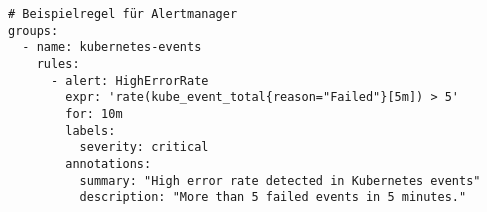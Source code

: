 \begin{verbatim}
# Beispielregel für Alertmanager
groups:
  - name: kubernetes-events
    rules:
      - alert: HighErrorRate
        expr: 'rate(kube_event_total{reason="Failed"}[5m]) > 5'
        for: 10m
        labels:
          severity: critical
        annotations:
          summary: "High error rate detected in Kubernetes events"
          description: "More than 5 failed events in 5 minutes."
\end{verbatim}
